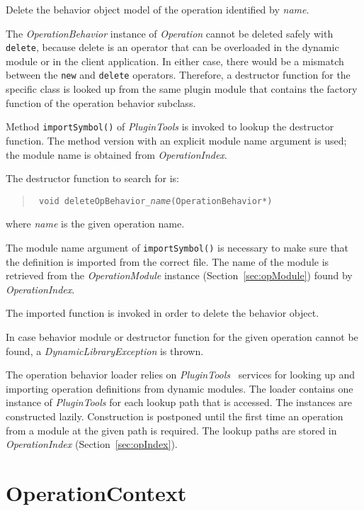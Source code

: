 \documentclass[a4paper,twoside]{tce}
\begin{document}
\begin{description}
  Delete the behavior object model of the operation identified by
  \emph{name}.

  The \emph{OperationBehavior} instance of \emph{Operation} cannot be
  deleted safely with \verb|delete|, because delete is an operator that can
  be overloaded in the dynamic module or in the client application.  In
  either case, there would be a mismatch between the \verb|new| and
  \verb|delete| operators.  Therefore, a destructor function for the
  specific class is looked up from the same plugin module that contains the
  factory function of the operation behavior subclass.

  Method \verb|importSymbol()|  of \emph{PluginTools} is invoked to lookup
  the destructor function.  The method version with an explicit module name
  argument is used; the module name is obtained from \emph{OperationIndex}.

  The destructor function to search for is:
  \begin{quote}\tt
    void deleteOpBehavior\verb|_|\textsl{name}(OperationBehavior*)
  \end{quote}
  where \emph{name} is the given operation name.

  The module name argument of \verb|importSymbol()| is necessary to make
  sure that the definition is imported from the correct file.  The name of
  the module is retrieved from the \emph{OperationModule} instance
  (Section~\ref{sec:opModule}) found by \emph{OperationIndex}.

  The imported function is invoked in order to delete the behavior object.

  In case behavior module or destructor function for the given operation 
  cannot be found, a \emph{DynamicLibraryException} is thrown.

\end{description}

The operation behavior loader relies on
\emph{PluginTools}~\cite{ToolkitDesign} services for looking up and
importing operation definitions from dynamic modules.  The loader contains
one instance of \emph{PluginTools} for each lookup path that is accessed.
The instances are constructed lazily.  Construction is postponed until the
first time an operation from a module at the given path is required.  The
lookup paths are stored in \emph{OperationIndex}
(Section~\ref{sec:opIndex}).

\section{OperationContext}
\label{sec:context-if}
\end{document}
